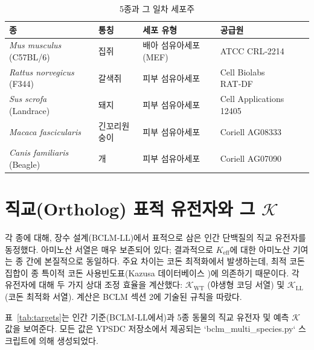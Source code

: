 \documentclass[12pt,a4paper]{article}
\newcommand{\REL}{\mathcal{K}}          %
\begin{document}
	\begin{table}[H]
		\centering
		\caption{5종과 그 일차 세포주}
		\label{tab:species}
		\begin{tabular}{@{}lllll@{}}
			\toprule
			\textbf{종} & \textbf{통칭} & \textbf{세포 유형} & \textbf{공급원} \\
			\midrule
			\textit{Mus musculus} (C57BL/6) & 집쥐 & 배아 섬유아세포 (MEF) & ATCC CRL‑2214 \\
			\textit{Rattus norvegicus} (F344) & 갈색쥐 & 피부 섬유아세포 & Cell Biolabs RAT‑DF \\
			\textit{Sus scrofa} (Landrace) & 돼지 & 피부 섬유아세포 & Cell Applications 12405 \\
			\textit{Macaca fascicularis} & 긴꼬리원숭이 & 피부 섬유아세포 & Coriell AG08333 \\
			\textit{Canis familiaris} (Beagle) & 개 & 피부 섬유아세포 & Coriell AG07090 \\
			\bottomrule
		\end{tabular}
	\end{table}
	
	\section{직교(Ortholog) 표적 유전자와 그 \(\REL\)}
	\label{sec:genes}
	각 종에 대해, 장수 설계(BCLM‑LL)에서 표적으로 삼은 인간 단백질의 직교 유전자를 동정했다. 아미노산 서열은 매우 보존되어 있다; 결과적으로 \(K_{\mathrm{eff}}\)에 대한 아미노산 기여는 종 간에 본질적으로 동일하다. 주요 차이는 코돈 최적화에서 발생하는데, 최적 코돈 집합이 종 특이적 코돈 사용빈도표(Kazusa 데이터베이스 \cite{codon_usage_db})에 의존하기 때문이다. 각 유전자에 대해 두 가지 상대 조정 효율을 계산했다: \(\REL_{\mathrm{WT}}\) (야생형 코딩 서열) 및 \(\REL_{\mathrm{LL}}\) (코돈 최적화 서열). 계산은 BCLM 섹션 2에 기술된 규칙을 따랐다.
	
	표~\ref{tab:targets}는 인간 기준(BCLM‑LL에서)과 5종 동물의 직교 유전자 및 예측 \(\REL\) 값을 보여준다. 모든 값은 YPSDC 저장소에서 제공되는 `bclm\_multi\_species.py` 스크립트에 의해 생성되었다.
	
\end{document}
